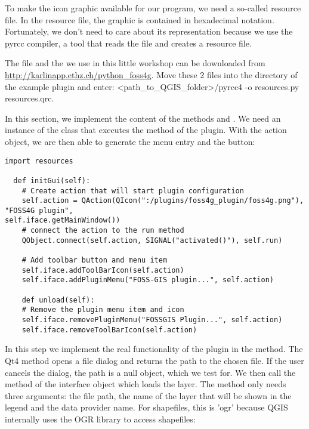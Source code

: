 
To make the icon graphic available for our program, we need a so-called
resource file. In the resource file, the graphic is contained in hexadecimal
notation. Fortunately, we don't need to care about its representation because
we use the pyrcc compiler, a tool that reads the file
 and creates a resource file. 

The file  and the  we use in
this little workshop can be downloaded from
\url{http://karlinapp.ethz.ch/python\_foss4g}. Move these 2 files into the
directory of the example plugin
 and enter: <path\_to\_QGIS\_folder>/pyrcc4 -o
resources.py resources.qrc.


In this section, we implement the content of the methods  and
. We need an instance of the class  that executes the
 method of the plugin. With the action object, we are then able to
generate the menu entry and the button:

\begin{verbatim}
import resources

  def initGui(self):
    # Create action that will start plugin configuration
    self.action = QAction(QIcon(":/plugins/foss4g_plugin/foss4g.png"), "FOSS4G plugin",
self.iface.getMainWindow())
    # connect the action to the run method
    QObject.connect(self.action, SIGNAL("activated()"), self.run)

    # Add toolbar button and menu item
    self.iface.addToolBarIcon(self.action)
    self.iface.addPluginMenu("FOSS-GIS plugin...", self.action)

    def unload(self):
    # Remove the plugin menu item and icon
    self.iface.removePluginMenu("FOSSGIS Plugin...", self.action)
    self.iface.removeToolBarIcon(self.action)
\end{verbatim}


In this step we implement the real functionality of the plugin in the
 method. The Qt4 method 
opens a file dialog and returns the path to the chosen file. If the user
cancels the dialog, the path is a null object, which we test for. We then
call the method  of the interface object which loads
the layer. The method only needs three arguments: the file path, the name of
the layer that will be shown in the legend and the data provider name. For
shapefiles, this is 'ogr' because QGIS internally uses the OGR library to
access shapefiles:

